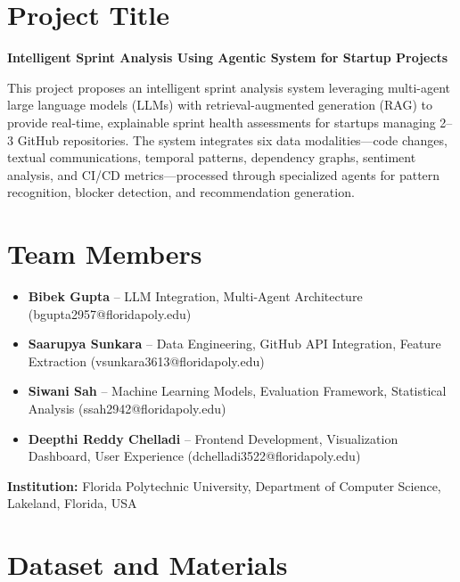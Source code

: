 \documentclass[journal]{IEEEtran}
\begin{document}
\section{Project Title}
\textbf{Intelligent Sprint Analysis Using Agentic System for Startup Projects}

This project proposes an intelligent sprint analysis system leveraging multi-agent large language models (LLMs) with retrieval-augmented generation (RAG) to provide real-time, explainable sprint health assessments for startups managing 2--3 GitHub repositories. The system integrates six data modalities---code changes, textual communications, temporal patterns, dependency graphs, sentiment analysis, and CI/CD metrics---processed through specialized agents for pattern recognition, blocker detection, and recommendation generation.

\section{Team Members}

\begin{itemize}
    \item \textbf{Bibek Gupta} -- LLM Integration, Multi-Agent Architecture (bgupta2957@floridapoly.edu)
    \item \textbf{Saarupya Sunkara} -- Data Engineering, GitHub API Integration, Feature Extraction (vsunkara3613@floridapoly.edu)
    \item \textbf{Siwani Sah} -- Machine Learning Models, Evaluation Framework, Statistical Analysis (ssah2942@floridapoly.edu)
    \item \textbf{Deepthi Reddy Chelladi} -- Frontend Development, Visualization Dashboard, User Experience (dchelladi3522@floridapoly.edu)
\end{itemize}

\noindent\textbf{Institution:} Florida Polytechnic University, Department of Computer Science, Lakeland, Florida, USA

\section{Dataset and Materials}
\end{document}
